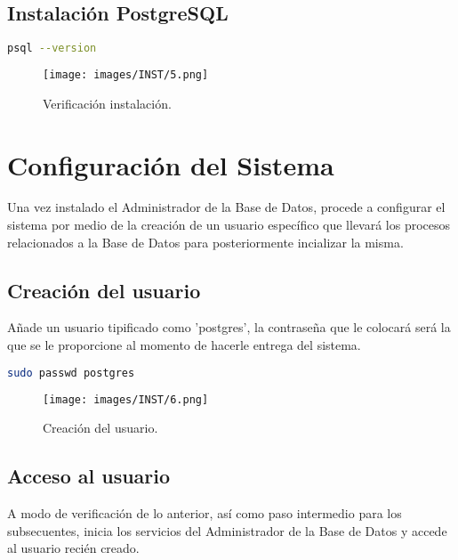 \subsection{Instalaci\'on PostgreSQL}
\begin{lstlisting}[language=bash]
    psql --version
\end{lstlisting}

\begin{figure}[htbp!]
	\begin{center}
		\texttt{[image: images/INST/5.png]}
		\caption{Verificación instalación.}
	\end{center}
\end{figure}

\bigbreak
\section{Configuración del Sistema}

Una vez instalado el Administrador de la Base de Datos, procede a configurar el sistema por medio de la creación de un usuario específico que llevará los procesos relacionados a la Base de Datos para posteriormente incializar la misma.

\subsection{Creaci\'on del usuario}

Añade un usuario tipificado como 'postgres', la contraseña que le colocará será la que se le proporcione al momento de hacerle entrega del sistema.

\begin{lstlisting}[language=bash]
    sudo passwd postgres
\end{lstlisting}

\begin{figure}[htbp!]
	\begin{center}
		\texttt{[image: images/INST/6.png]}
		\caption{Creación del usuario.}
	\end{center}
\end{figure}

\subsection{Acceso al usuario}

A modo de verificación de lo anterior, así como paso intermedio para los subsecuentes, inicia los servicios del Administrador de la Base de Datos y accede al usuario recién creado.

